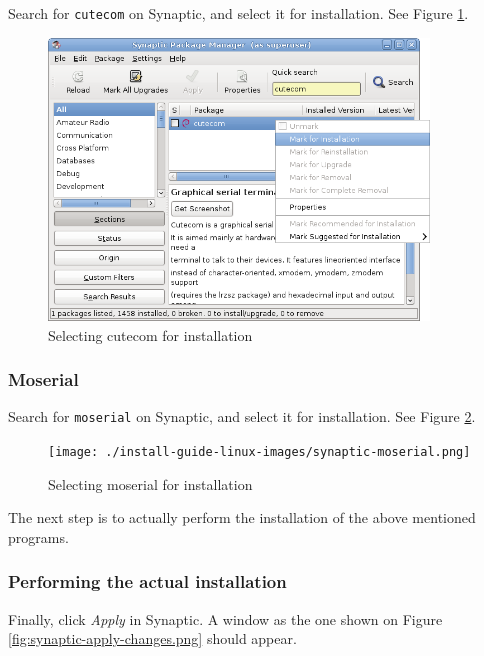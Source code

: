 \documentclass[a4paper, 10pt]{article}
\begin{document}
Search for \verb+cutecom+ on Synaptic, and select it for installation.
See Figure \ref{fig:synaptic-cutecom}.

    \begin{figure}[H]
    \centering
        \includegraphics[width=0.9\textwidth]{./install-guide-linux-images/synaptic-cutecom.png}
        \caption{Selecting cutecom for installation}
        \label{fig:synaptic-cutecom}
    \end{figure}

\subsubsection{Moserial}

Search for \verb+moserial+ on Synaptic, and select it for installation.
See Figure \ref{fig:synaptic-moserial}.


    \begin{figure}[H]
    \centering
        \texttt{[image: ./install-guide-linux-images/synaptic-moserial.png]}
        \caption{Selecting moserial for installation}
        \label{fig:synaptic-moserial}
    \end{figure}


The next step is to actually perform the installation of the above mentioned programs.

\subsubsection{Performing the actual installation}

Finally, click \emph{Apply} in Synaptic.
A window as the one shown on Figure \ref{fig:synaptic-apply-changes.png}
should appear.
\end{document}
